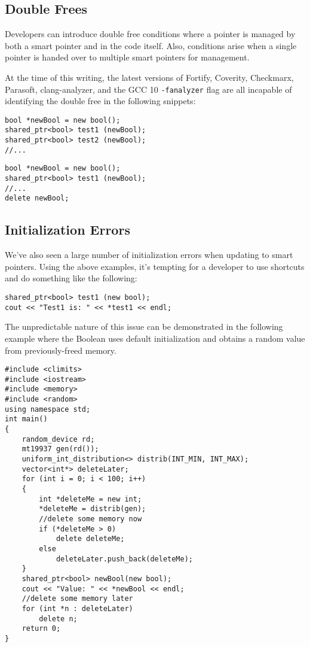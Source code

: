 \subsection{Double Frees}

Developers can introduce double free conditions where a pointer is managed by both a smart pointer and in the code itself. Also, conditions arise when a single pointer is handed over to multiple smart pointers for management.

At the time of this writing, the latest versions of Fortify, Coverity, Checkmarx, Parasoft, clang-analyzer, and the GCC 10 \texttt{-fanalyzer} flag are all incapable of identifying the double free in the following snippets:

\begin{lstlisting}[caption={Double Smart Pointer},captionpos=b,style=CStyle,basicstyle=\small]
bool *newBool = new bool();
shared_ptr<bool> test1 (newBool);
shared_ptr<bool> test2 (newBool);
//...
\end{lstlisting}

\begin{lstlisting}[caption={Smart and Dumb Pointer},captionpos=b,style=CStyle,basicstyle=\small]
bool *newBool = new bool();
shared_ptr<bool> test1 (newBool);
//...
delete newBool;
\end{lstlisting}

\subsection{Initialization Errors}

We've also seen a large number of initialization errors when updating to smart pointers. Using the above examples, it's tempting for a developer to use shortcuts and do something like the following:

\begin{lstlisting}[caption={Uninitialized Boolean},captionpos=b,style=CStyle,basicstyle=\small]
shared_ptr<bool> test1 (new bool);
cout << "Test1 is: " << *test1 << endl;
\end{lstlisting}

The unpredictable nature of this issue can be demonstrated in the following example where the Boolean uses default initialization and obtains a random value from previously-freed memory.

\begin{lstlisting}[caption={Uninitialized Boolean},captionpos=b,style=CStyle,basicstyle=\small]
#include <climits>
#include <iostream>
#include <memory>
#include <random>
using namespace std;
int main()
{
	random_device rd;
	mt19937 gen(rd());
	uniform_int_distribution<> distrib(INT_MIN, INT_MAX);
	vector<int*> deleteLater;
	for (int i = 0; i < 100; i++)
	{
		int *deleteMe = new int;
		*deleteMe = distrib(gen);
		//delete some memory now
		if (*deleteMe > 0)
			delete deleteMe;
		else
			deleteLater.push_back(deleteMe);
	}
	shared_ptr<bool> newBool(new bool);
	cout << "Value: " << *newBool << endl;
	//delete some memory later
	for (int *n : deleteLater)
		delete n;
	return 0;
}
\end{lstlisting}

